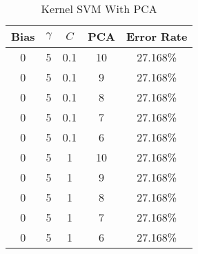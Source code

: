 \begin{center}
\begin{longtable}{|c|c|c|c|c|}
\caption{Kernel SVM With PCA}\label{tab:svm_rbfpca_acctable}\\
\hline
Bias & $\gamma$ & $C$ & PCA & Error Rate \\
\hline
0 & 5 & 0.1 & 10 & 27.168\% \\
\hline
0 & 5 & 0.1 & 9 & 27.168\% \\
\hline
0 & 5 & 0.1 & 8 & 27.168\% \\
\hline
0 & 5 & 0.1 & 7 & 27.168\% \\
\hline
0 & 5 & 0.1 & 6 & 27.168\% \\
\hline
0 & 5 & 1 & 10 & 27.168\% \\
\hline
0 & 5 & 1 & 9 & 27.168\% \\
\hline
0 & 5 & 1 & 8 & 27.168\% \\
\hline
0 & 5 & 1 & 7 & 27.168\% \\
\hline
0 & 5 & 1 & 6 & 27.168\% \\
\hline
\hline
\end{longtable}
\end{center}
